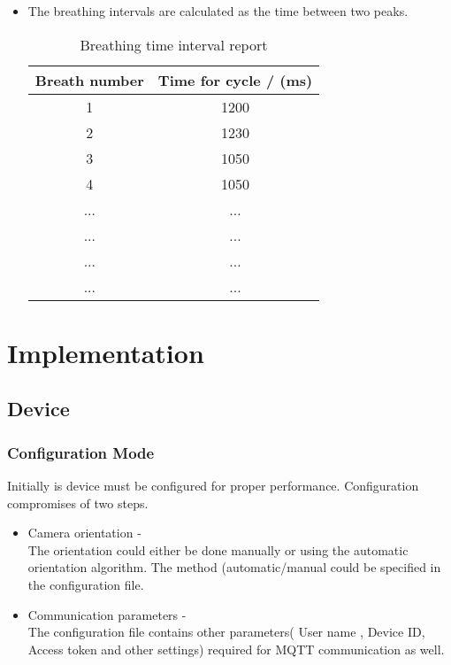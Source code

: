 \documentclass{report}
\begin{document}
\begin{itemize}
    \item The breathing intervals are calculated as the time between two peaks.
    


    

    \begin{table}[H]
    \begin{center}\begin{tabular}{|c|c|}
        \hline
         Breath number& Time for cycle / (ms) \\
         \hline
         1&1200\\2&1230\\3&1050\\4&1050\\
         ...&...\\...&...\\...&...\\...&...\\
         \hline
    \end{tabular}
        \caption{Breathing time interval report}
        \label{tab:my_label}
    \end{center}
    \end{table}    
    
    
    
    
    
\end{itemize}

\section{Implementation}

\subsection{Device}

\subsubsection{Configuration Mode}

Initially is device must be configured for proper performance. Configuration compromises of two steps.
\begin{itemize}
    \item Camera orientation - \\
        The orientation could either be done manually or using the automatic orientation algorithm. The method (automatic/manual could be specified in the configuration file.
    \item Communication parameters -\\ 
        The configuration file contains other parameters( User name , Device ID, Access token and other settings) required for MQTT communication as well.
\end{itemize}
\end{document}
